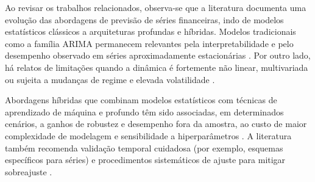






Ao revisar os trabalhos relacionados, observa-se que a literatura documenta uma evolução das abordagens de previsão de séries financeiras, indo de modelos estatísticos clássicos a arquiteturas profundas e híbridas. Modelos tradicionais como a família ARIMA permanecem relevantes pela interpretabilidade e pelo desempenho observado em séries aproximadamente estacionárias \cite{box_2015,hyndman_2018,rotela2014arima}. Por outro lado, há relatos de limitações quando a dinâmica é fortemente não linear, multivariada ou sujeita a mudanças de regime e elevada volatilidade \cite{makridakis2018statistical,derbentsev2020machine}.

Abordagens híbridas que combinam modelos estatísticos com técnicas de aprendizado de máquina e profundo têm sido associadas, em determinados cenários, a ganhos de robustez e desempenho fora da amostra, ao custo de maior complexidade de modelagem e sensibilidade a hiperparâmetros \cite{goncalves2023impacto,kashif2024lstm,nasir2025lmd}. A literatura também recomenda validação temporal cuidadosa (por exemplo, esquemas específicos para séries) e procedimentos sistemáticos de ajuste para mitigar sobreajuste \cite{bergmeir2012,lopezdeprado2018,akiba2019}.

